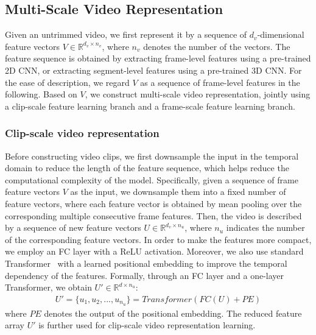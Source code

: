 \documentclass[sigconf]{acmart}
\begin{document}
\subsection{Multi-Scale Video Representation}

Given an untrimmed video, we first represent it by a sequence of $d_v$-dimensional feature vectors $V\in\mathbb{R}^{d_v\times{n_v}}$, where $n_v$ denotes the number of the vectors.
The feature sequence is obtained by extracting frame-level features using a pre-trained 2D CNN, or extracting segment-level features using a pre-trained 3D CNN.
For the ease of description, we regard $V$ as a sequence of frame-level features in the following.
Based on $V$, we construct multi-scale video representation, jointly using a clip-scale feature learning branch and a frame-scale feature learning branch.



\subsubsection{Clip-scale video representation}
Before constructing video clips, we first downsample the input in the temporal domain to reduce the length of the feature sequence, which helps reduce the computational complexity of the model.
Specifically, given a sequence of frame feature vectors $V$ as the input, we downsample them into a fixed number of feature vectors, where each feature vector is obtained by mean pooling over the corresponding multiple consecutive frame features.
Then, the video is described by a sequence of new feature vectors $U\in\mathbb{R}^{d_v\times{n_u}}$, where $n_u$ indicates the number of the corresponding feature vectors.
In order to make the features more compact, we employ an FC layer with a ReLU activation.
Moreover, we also use standard Transformer~\cite{vaswani2017attention} with a learned positional embedding to improve the temporal dependency of the features.
Formally, through an FC layer and a one-layer Transformer, we obtain $U'\in\mathbb{R}^{d\times{n_u}}$:
\begin{equation}
\begin{split}
    U'= \{u_1, u_2, ..., u_{n_u}\}=Transformer(FC(U)+PE)
\end{split}
\end{equation}
where $PE$ denotes the output of the positional embedding. The reduced feature array $U'$ is further used for clip-scale  video representation learning. 
\end{document}
